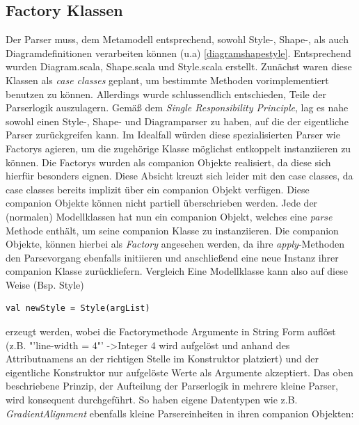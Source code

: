 \subsection{Factory Klassen}
Der Parser muss, dem Metamodell entsprechend, sowohl Style-, Shape-, als auch Diagramdefinitionen verarbeiten können (u.a) \ref{diagramshapestyle}. Entsprechend wurden Diagram.scala, Shape.scala und Style.scala erstellt. Zunächst waren diese Klassen als \textit{case classes} geplant, um bestimmte Methoden vorimplementiert benutzen zu können. Allerdings wurde schlussendlich entschieden, Teile der Parserlogik auszulagern. Gemäß dem \textit{Single Responsibility Principle}, lag es nahe sowohl einen Style-, Shape- und Diagramparser zu haben, auf die der eigentliche Parser zurückgreifen kann.
Im Idealfall würden diese spezialisierten Parser wie Factorys agieren, um die zugehörige Klasse möglichst entkoppelt instanziieren zu können. Die Factorys wurden als companion Objekte realisiert, da diese sich hierfür besonders eignen. Diese Absicht kreuzt sich leider mit den case classes, da case classes bereits implizit über ein companion Objekt verfügen. Diese companion Objekte können nicht partiell überschrieben werden.
Jede der (normalen) Modellklassen hat nun ein companion Objekt, welches eine \textit{parse} Methode enthält, um seine companion Klasse zu instanziieren.
Die companion Objekte, können hierbei als \textit{Factory} angesehen werden, da ihre \textit{apply}-Methoden den Parsevorgang ebenfalls initiieren und anschließend eine neue Instanz ihrer companion Klasse zurückliefern. Vergleich \citet[p. 80]{esser:scala}
Eine Modellklasse kann also auf diese Weise (Bsp. Style)
\begin{lstlisting}[style=scala, aboveskip=0pt]
val newStyle = Style(argList)
\end{lstlisting}
erzeugt werden, wobei die Factorymethode Argumente in String Form auflöst (z.B. "'line-width = 4"' -\textgreater  Integer 4 wird aufgelöst und anhand des Attributnamens an der richtigen Stelle im Konstruktor platziert) und der eigentliche Konstruktor nur aufgelöste Werte als Argumente akzeptiert.
Das oben beschriebene Prinzip, der Aufteilung der Parserlogik in mehrere kleine Parser, wird konsequent durchgeführt. So haben eigene Datentypen wie z.B. \textit{GradientAlignment} ebenfalls kleine Parsereinheiten in ihren companion Objekten:
